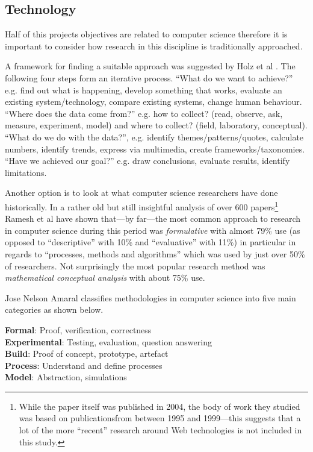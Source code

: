 \subsection{Technology}

Half of this projects objectives are related to computer science therefore it is important to consider how research in this discipline is traditionally approached.

A framework for finding a suitable approach was suggested by Holz et al \citeyear{Holz2006}. The following four steps form an iterative process. ``What do we want to achieve?'' e.g. find out what is happening, develop something that works, evaluate an existing system/technology, compare existing systems, change human behaviour. ``Where does the data come from?'' e.g. how to collect? (read, observe, ask, measure, experiment, model) and where to collect? (field, laboratory, conceptual). ``What do we do with the data?'', e.g. identify themes/patterns/quotes, calculate numbers, identify trends, express via multimedia, create frameworks/taxonomies. ``Have we achieved our goal?'' e.g. draw conclusions, evaluate results, identify limitations.


Another option is to look at what computer science researchers have done historically. In a rather old but still insightful analysis of over 600 papers\footnote{While the paper itself was published in 2004, the body of work they studied was based on publicationsfrom between 1995 and 1999---this suggests that a lot of the more ``recent'' research around Web technologies is not included in this study.} Ramesh et al \citeyear{Ramesh2004} have shown that---by far---the most common approach to research in computer science during this period was \emph{formulative} with almost 79\% use (as opposed to ``descriptive'' with 10\% and ``evaluative'' with 11\%) in particular in regards to ``processes, methods and algorithms'' which was used by just over 50\% of researchers. Not surprisingly the most popular research method was \emph{mathematical conceptual analysis} with about 75\% use.

Jose Nelson Amaral \citeyear{Amaral} classifies methodologies in computer science into five main categories as shown below.

\textbf{Formal}: Proof, verification, correctness\\
\textbf{Experimental}: Testing, evaluation, question answering\\
\textbf{Build}: Proof of concept, prototype, artefact\\
\textbf{Process}: Understand and define processes\\
\textbf{Model}: Abstraction, simulations

